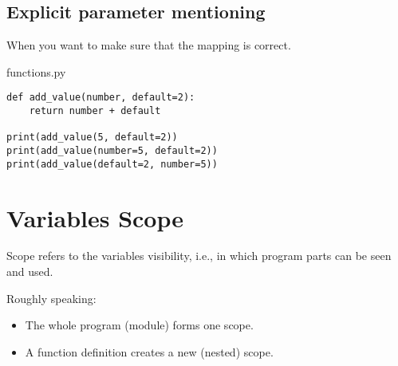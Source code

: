 \documentclass[aspectratio=1610,slidestop]{beamer}
\begin{document}
\subsection{Explicit parameter mentioning}
\begin{pframe}
 When you want to make sure that the mapping is correct.
 \medskip

 \begin{minipage}[t]{0.51\textwidth}
  \begin{pythonfile}{functions.py}
   \begin{verbatim}
def add_value(number, default=2):
    return number + default

print(add_value(5, default=2))
print(add_value(number=5, default=2))
print(add_value(default=2, number=5))
   \end{verbatim}
  \end{pythonfile}
 \end{minipage}\qquad
 \begin{minipage}[t]{0.43\textwidth}
  \vspace{-3.45cm}
  \begin{terminal}
  \end{terminal}
 \end{minipage}
\end{pframe}


\section{Variables Scope}

\begin{pframe}
 Scope refers to the variables visibility, i.e., in which program parts can be seen and used.
 \medskip

  Roughly speaking:
  \begin{itemize}
   \item The whole program (module) forms one scope.
   \item A function definition creates a new (nested) scope.
 \end{itemize}
\end{pframe}
\end{document}
